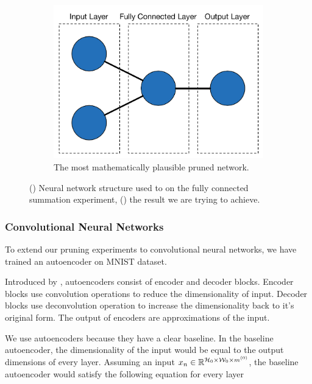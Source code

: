 \begin{figure}[h!]
\begin{center}
\begin{subfigure}{.5\textwidth}
  \end{subfigure}%
    \begin{subfigure}{.5\textwidth}
      \begin{center}
        \includegraphics[width=.9\linewidth]{images/optimum_fc_summation.pdf}
        \caption{The most mathematically plausible pruned network.}
        \label{fig:optimum_fc_summation}
          \end{center}
  \end{subfigure}
  \end{center}
  \caption{() Neural network structure used to on the fully connected summation experiment, () the result we are trying to achieve.}
  \label{fig:fc_node_pruning}
\end{figure}

\subsubsection{Convolutional Neural Networks}
To extend our pruning experiments to convolutional neural networks, we have trained an autoencoder on MNIST dataset. 

Introduced by \cite{hinton2006reducing}, autoencoders consist of encoder and decoder blocks. Encoder blocks use convolution operations to reduce the dimensionality of input. Decoder blocks use deconvolution operation to increase the dimensionality back to it's original form. The output of encoders are approximations of the input. 

We use autoencoders because they have a clear baseline. In the baseline autoencoder, the dimensionality of the input would be equal to the output dimensions of every layer. Assuming an input $x_{n} \in \mathbb{R}^{ \mathcal{H}_{0} \times \mathcal{W}_{0} \times m^{(0)}}$, the baseline autoencoder would satisfy the following equation for every layer

